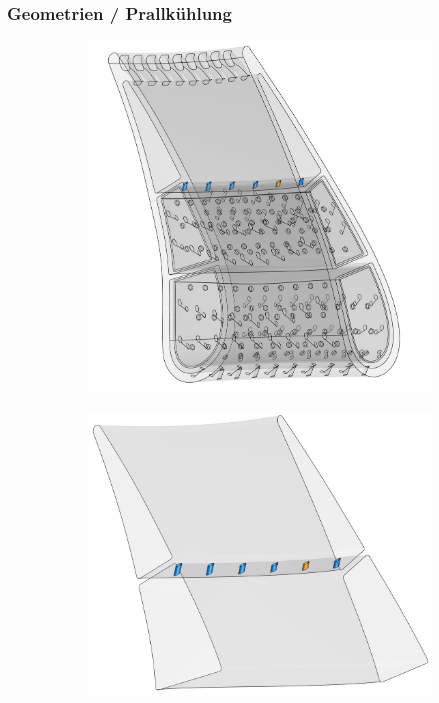 \documentclass[8pt, aspectratio=169]{beamer}
\begin{document}
\begin{frame}
	\frametitle{Geometrien / Prallkühlung}
	\vspace{-1cm}\hspace{-0.5cm}
	\begin{figure}[H]
		\centering
		\begin{subfigure}{.3\textwidth}
			\includegraphics[width=\textwidth]{../../tec/interchannel/01.png}
		\end{subfigure}
		\begin{subfigure}{.3\textwidth}
			\includegraphics[width=\textwidth]{../../tec/interchannel/02.png}

\end{subfigure}
\end{figure}
\end{frame}
\end{document}
